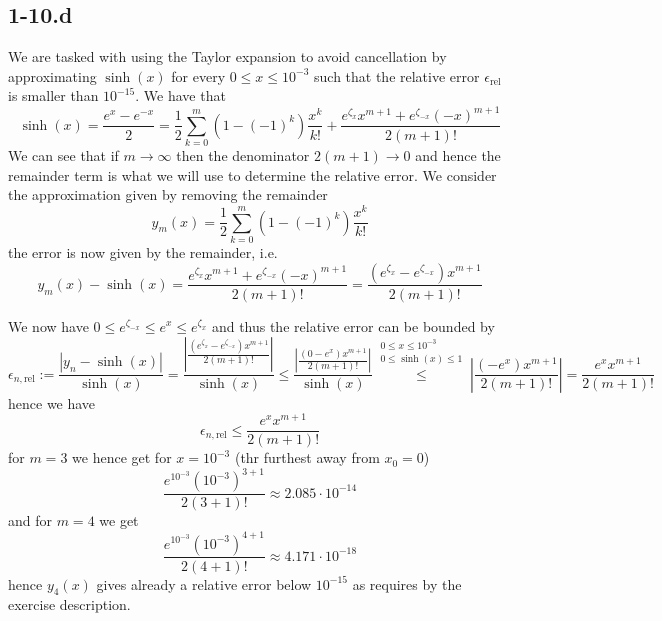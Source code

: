 \documentclass{article}
\begin{document}
\subsection*{1-10.d}
We are tasked with using the Taylor expansion to avoid cancellation by approximating $\sinh\left(x\right)$ for every $0 \leq x \leq 10^{-3}$ such that the relative error $\epsilon_{\text{rel}}$ is smaller than $10^{-15}$. We have that
\begin{equation*}
    \sinh\left(x\right) = \frac{e^{x}-e^{-x}}{2} = \frac{1}{2}\sum_{k=0}^{m}\left(1- \left(-1\right)^{k}\right)\frac{x^{k}}{k!} + \frac{e^{\zeta_{x}}x^{m+1} + e^{\zeta_{-x}}\left(-x\right)^{m+1}}{2\left(m+1\right)!}
\end{equation*}
We can see that if $m \to \infty$ then the denominator $2\left(m+1\right) \to 0$ and hence the remainder term is what we will use to determine the relative error. We consider the approximation given by removing the remainder
\begin{equation*}
    y_{m}\left(x\right) = \frac{1}{2}\sum_{k=0}^{m}\left(1- \left(-1\right)^{k}\right)\frac{x^{k}}{k!}  
\end{equation*} 
the error is now given by the remainder, i.e.
\begin{equation*}
    y_{m}\left(x\right) - \sinh\left(x\right) = \frac{e^{\zeta_{x}}x^{m+1} + e^{\zeta_{-x}}\left(-x\right)^{m+1}}{2\left(m+1\right)!} = \frac{\left(e^{\zeta_{x}} - e^{\zeta_{-x}}\right)x^{m+1}}{2\left(m+1\right)!}
\end{equation*}

\pagebreak

\noindent We now have $0 \leq e^{\zeta_{-x}} \leq e^{x} \leq e^{\zeta_{x}}$ and thus the relative error can be bounded by
\begin{equation*}
    \epsilon_{n, \text{rel}} := \frac{\left\lvert y_{n} - \sinh\left(x\right)\right\rvert}{\sinh\left(x\right)}  = \frac{\left\lvert \frac{\left(e^{\zeta_{x}} - e^{\zeta_{-x}}\right)x^{m+1}}{2\left(m+1\right)!}\right\rvert}{\sinh\left(x\right)} \leq \frac{\left\lvert \frac{\left(0 - e^{x}\right)x^{m+1}}{2\left(m+1\right)!}\right\rvert}{\sinh\left(x\right)} \overset{\substack{0\leq x \leq 10^{-3} \\[0.5mm] 0 \leq \sinh\left(x\right) \leq 1}}{\leq} \left\lvert \frac{\left(-e^{x}\right)x^{m+1}}{2\left(m+1\right)!}\right\rvert =  \frac{e^{x}x^{m+1}}{2\left(m+1\right)!}
\end{equation*}
hence we have 
\begin{equation*}
    \epsilon_{n, \text{rel}} \leq \frac{e^{x}x^{m+1}}{2\left(m+1\right)!}
\end{equation*}
for $m = 3$ we hence get for $x=10^{-3}$ (thr furthest away from $x_{0} = 0$)
\begin{equation*}
    \frac{e^{10^{-3}}\left(10^{-3}\right)^{3+1}}{2\left(3+1\right)!} \approx 2.085 \cdot 10^{-14}
\end{equation*}
and for $m=4$ we get 
\begin{equation*}
    \frac{e^{10^{-3}}\left(10^{-3}\right)^{4+1}}{2\left(4+1\right)!} \approx 4.171\cdot 10^{-18}
\end{equation*}
hence $y_{4}\left(x\right)$ gives already a relative error below $10^{-15}$ as requires by the exercise description.
\end{document}
